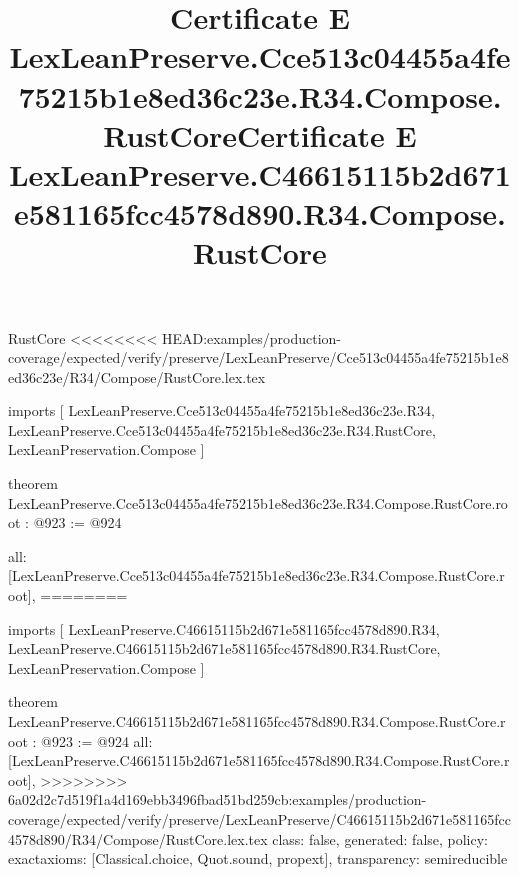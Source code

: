 \begin{lexlean}{RustCore}
<<<<<<<< HEAD:examples/production-coverage/expected/verify/preserve/LexLeanPreserve/Cce513c04455a4fe75215b1e8ed36c23e/R34/Compose/RustCore.lex.tex
\title{Certificate E LexLeanPreserve.Cce513c04455a4fe75215b1e8ed36c23e.R34.Compose.RustCore}
\begin{coremodule}
imports [
  LexLeanPreserve.Cce513c04455a4fe75215b1e8ed36c23e.R34,
  LexLeanPreserve.Cce513c04455a4fe75215b1e8ed36c23e.R34.RustCore,
  LexLeanPreservation.Compose
]

theorem LexLeanPreserve.Cce513c04455a4fe75215b1e8ed36c23e.R34.Compose.RustCore.root : @923 := @924 {
  all: [LexLeanPreserve.Cce513c04455a4fe75215b1e8ed36c23e.R34.Compose.RustCore.root],
========
\title{Certificate E LexLeanPreserve.C46615115b2d671e581165fcc4578d890.R34.Compose.RustCore}
\begin{coremodule}
imports [
  LexLeanPreserve.C46615115b2d671e581165fcc4578d890.R34,
  LexLeanPreserve.C46615115b2d671e581165fcc4578d890.R34.RustCore,
  LexLeanPreservation.Compose
]

theorem LexLeanPreserve.C46615115b2d671e581165fcc4578d890.R34.Compose.RustCore.root : @923 := @924 {
  all: [LexLeanPreserve.C46615115b2d671e581165fcc4578d890.R34.Compose.RustCore.root],
>>>>>>>> 6a02d2c7d519f1a4d169ebb3496fbad51bd259cb:examples/production-coverage/expected/verify/preserve/LexLeanPreserve/C46615115b2d671e581165fcc4578d890/R34/Compose/RustCore.lex.tex
  class: false,
  generated: false,
  policy: exact{axioms: [Classical.choice, Quot.sound, propext]},
  transparency: semireducible
}


\end{coremodule}}
\end{coremodule}
\end{lexlean}
